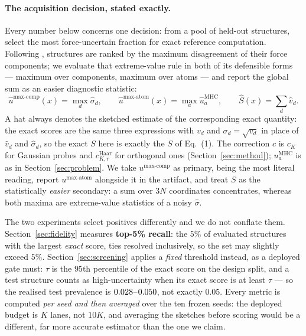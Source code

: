 \documentclass{article}
\begin{document}
\paragraph{The acquisition decision, stated exactly.}
\label{par:acq}
Every number below concerns one decision: from a pool of held-out structures, select the most
force-uncertain fraction for exact reference computation. Following \citet{beck2025mhc}, structures
are ranked by the maximum disagreement of their force components; we evaluate that extreme-value
rule in both of its defensible forms --- maximum over components, maximum over atoms --- and report
the global sum as an easier diagnostic statistic:
\begin{equation}
\widehat u^{\max\text{-comp}}(x)=\max_{d}\widehat\sigma_d,\qquad
\widehat u^{\max\text{-atom}}(x)=\max_{a}\widehat u_a^{\mathrm{MHC}},\qquad
\widehat S(x)=\sum_{d}\widehat v_d .
\end{equation}
A hat always denotes the sketched estimate of the corresponding exact quantity: the exact scores are
the same three expressions with $v_d$ and $\sigma_d=\sqrt{v_d}$ in place of $\widehat v_d$ and
$\widehat\sigma_d$, so the exact $S$ here is exactly the $S$ of Eq.~(1). The correction $c$ is
$c_K$ for Gaussian probes and $c^{\mathrm{Haar}}_{K,r}$ for orthogonal ones
(Section~\ref{sec:method}); $u_a^{\mathrm{MHC}}$ is as in Section~\ref{sec:problem}. We take
$u^{\max\text{-comp}}$ as primary, being the most literal reading, report $u^{\max\text{-atom}}$
alongside it in the artifact, and treat $S$ as the statistically \emph{easier} secondary: a sum over
$3N$ coordinates concentrates, whereas both maxima are extreme-value statistics of a noisy
$\widehat\sigma$.

The two experiments select positives differently and we do not conflate them.
Section~\ref{sec:fidelity} measures \textbf{top-5\% recall}: the $5\%$ of evaluated structures with
the largest \emph{exact} score, ties resolved inclusively, so the set may slightly exceed $5\%$.
Section~\ref{sec:screening} applies a \emph{fixed} threshold instead, as a deployed gate must:
$\tau$ is the $95$th percentile of the exact score on the design split, and a test structure counts
as high-uncertainty when its exact score is at least $\tau$ --- so the realised test prevalence is
$0.028$--$0.050$, not exactly $0.05$. Every metric is computed
\emph{per seed and then averaged} over the ten frozen seeds: the deployed budget is $K$ lanes, not
$10K$, and averaging the sketches before scoring would be a different, far more accurate estimator
than the one we claim.
\end{document}
